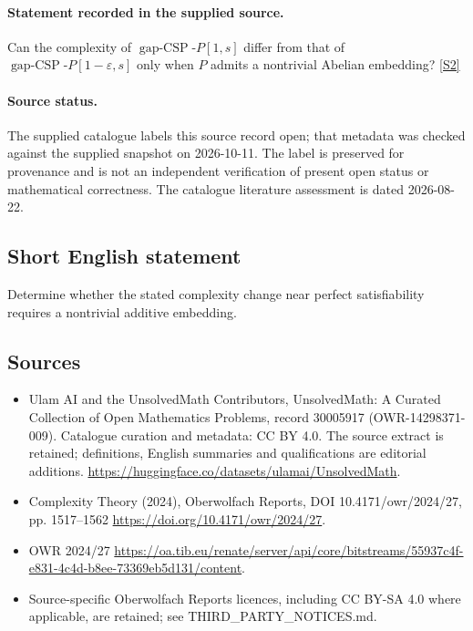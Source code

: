 \documentclass[11pt]{article}
\begin{document}
\paragraph{Statement recorded in the supplied source.}
Can the complexity of $\operatorname{gap-CSP}\text{-}P[1,s]$ differ from that of $\operatorname{gap-CSP}\text{-}P[1-\varepsilon,s]$ only when $P$ admits a nontrivial Abelian embedding? \href{https://doi.org/10.4171/owr/2024/27}{[S2]}
\paragraph{Source status.}
The supplied catalogue labels this source record open; that metadata was checked against the supplied snapshot on 2026-10-11. The label is preserved for provenance and is not an independent verification of present open status or mathematical correctness. The catalogue literature assessment is dated 2026-08-22.
\subsection{Short English statement}
Determine whether the stated complexity change near perfect satisfiability requires a nontrivial additive embedding.
\subsection{Sources}
\begin{itemize}
\item[S1] Ulam AI and the UnsolvedMath Contributors, UnsolvedMath: A Curated Collection of Open Mathematics Problems, record 30005917 (OWR-14298371-009). Catalogue curation and metadata: CC BY 4.0. The source extract is retained; definitions, English summaries and qualifications are editorial additions.
\url{https://huggingface.co/datasets/ulamai/UnsolvedMath}.
\item[S2] Complexity Theory (2024), Oberwolfach Reports, DOI 10.4171/owr/2024/27, pp. 1517--1562
\url{https://doi.org/10.4171/owr/2024/27}.
\item[S3] OWR 2024/27
\url{https://oa.tib.eu/renate/server/api/core/bitstreams/55937c4f-e831-4c4d-b8ee-73369eb5d131/content}.
\item Source-specific Oberwolfach Reports licences, including CC BY-SA 4.0 where applicable, are retained; see THIRD\_PARTY\_NOTICES.md.
\end{itemize}
\end{document}
